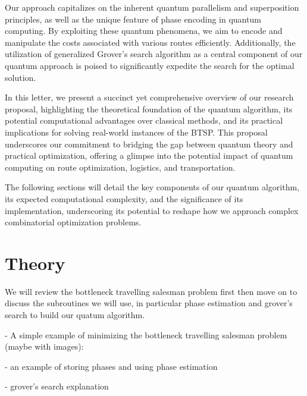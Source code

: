 \documentclass[twocolumn,showpacs,preprintnumbers,amsmath,amssymb]{revtex4}
\begin{document}
		Our approach capitalizes on the inherent quantum parallelism and superposition principles, as well as the unique feature of phase encoding in quantum computing. By exploiting these quantum phenomena, we aim to encode and manipulate the costs associated with various routes efficiently. Additionally, the utilization of generalized Grover's search algorithm as a central component of our quantum approach is poised to significantly expedite the search for the optimal solution.
		
		In this letter, we present a succinct yet comprehensive overview of our research proposal, highlighting the theoretical foundation of the quantum algorithm, its potential computational advantages over classical methods, and its practical implications for solving real-world instances of the BTSP. This proposal underscores our commitment to bridging the gap between quantum theory and practical optimization, offering a glimpse into the potential impact of quantum computing on route optimization, logistics, and transportation.
		
		The following sections will detail the key components of our quantum algorithm, its expected computational complexity, and the significance of its implementation, underscoring its potential to reshape how we approach complex combinatorial optimization problems.
		
		
		\section{Theory}
		
		
		We will review the bottleneck travelling salesman problem first then move on to discuss the subroutines we will use, in particular phase estimation and grover's search to build our quatum algorithm. 
		
		- A simple example of minimizing the bottleneck travelling salesman problem (maybe with images):
		
		- an example of storing phases and using phase estimation
		
		- grover's search explanation
		
	
\end{document}
